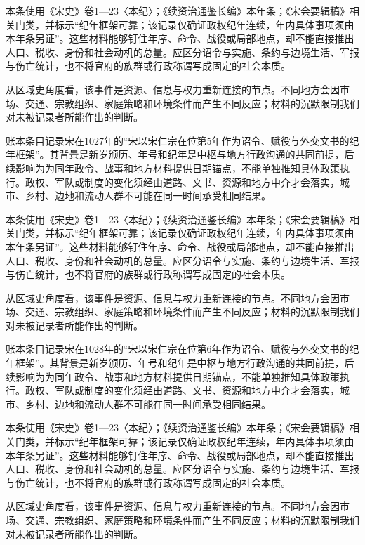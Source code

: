 本条使用《宋史》卷1—23〈本纪〉；《续资治通鉴长编》本年条；《宋会要辑稿》相关门类，并标示“纪年框架可靠；该记录仅确证政权纪年连续，年内具体事项须由本年条另证”。这些材料能够钉住年序、命令、战役或局部地点，却不能直接推出人口、税收、身份和社会动机的总量。应区分诏令与实施、条约与边境生活、军报与伤亡统计，也不将官府的族群或行政称谓写成固定的社会本质。

从区域史角度看，该事件是资源、信息与权力重新连接的节点。不同地方会因市场、交通、宗教组织、家庭策略和环境条件而产生不同反应；材料的沉默限制我们对未被记录者所能作出的判断。

账本条目记录宋在1027年的“宋以宋仁宗在位第5年作为诏令、赋役与外交文书的纪年框架”。其背景是新岁颁历、年号和纪年是中枢与地方行政沟通的共同前提，后续影响为为同年政令、战事和地方材料提供日期锚点，不能单独推知具体政策执行。政权、军队或制度的变化须经由道路、文书、资源和地方中介才会落实，城市、乡村、边地和流动人群不可能在同一时间承受相同结果。

本条使用《宋史》卷1—23〈本纪〉；《续资治通鉴长编》本年条；《宋会要辑稿》相关门类，并标示“纪年框架可靠；该记录仅确证政权纪年连续，年内具体事项须由本年条另证”。这些材料能够钉住年序、命令、战役或局部地点，却不能直接推出人口、税收、身份和社会动机的总量。应区分诏令与实施、条约与边境生活、军报与伤亡统计，也不将官府的族群或行政称谓写成固定的社会本质。

从区域史角度看，该事件是资源、信息与权力重新连接的节点。不同地方会因市场、交通、宗教组织、家庭策略和环境条件而产生不同反应；材料的沉默限制我们对未被记录者所能作出的判断。

账本条目记录宋在1028年的“宋以宋仁宗在位第6年作为诏令、赋役与外交文书的纪年框架”。其背景是新岁颁历、年号和纪年是中枢与地方行政沟通的共同前提，后续影响为为同年政令、战事和地方材料提供日期锚点，不能单独推知具体政策执行。政权、军队或制度的变化须经由道路、文书、资源和地方中介才会落实，城市、乡村、边地和流动人群不可能在同一时间承受相同结果。

本条使用《宋史》卷1—23〈本纪〉；《续资治通鉴长编》本年条；《宋会要辑稿》相关门类，并标示“纪年框架可靠；该记录仅确证政权纪年连续，年内具体事项须由本年条另证”。这些材料能够钉住年序、命令、战役或局部地点，却不能直接推出人口、税收、身份和社会动机的总量。应区分诏令与实施、条约与边境生活、军报与伤亡统计，也不将官府的族群或行政称谓写成固定的社会本质。

从区域史角度看，该事件是资源、信息与权力重新连接的节点。不同地方会因市场、交通、宗教组织、家庭策略和环境条件而产生不同反应；材料的沉默限制我们对未被记录者所能作出的判断。

